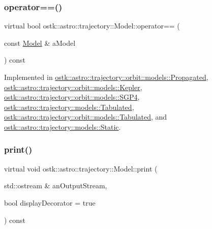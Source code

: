 \subsubsection{\texorpdfstring{operator==()}{operator==()}}
{\footnotesize\ttfamily virtual bool ostk\+::astro\+::trajectory\+::\+Model\+::operator== (\begin{DoxyParamCaption}\item[{const \hyperlink{classostk_1_1astro_1_1trajectory_1_1_model}{Model} \&}]{a\+Model }\end{DoxyParamCaption}) const\hspace{0.3cm}{\ttfamily [pure virtual]}}



Implemented in \hyperlink{classostk_1_1astro_1_1trajectory_1_1orbit_1_1models_1_1_propagated_a29b52ccf653fbd84699edab0f198f590}{ostk\+::astro\+::trajectory\+::orbit\+::models\+::\+Propagated}, \hyperlink{classostk_1_1astro_1_1trajectory_1_1orbit_1_1models_1_1_kepler_ad2a61eb0cbd9887fc2180dc0818c209e}{ostk\+::astro\+::trajectory\+::orbit\+::models\+::\+Kepler}, \hyperlink{classostk_1_1astro_1_1trajectory_1_1orbit_1_1models_1_1_s_g_p4_ad51d979b8b9b37251b6381cfe9df55ea}{ostk\+::astro\+::trajectory\+::orbit\+::models\+::\+S\+G\+P4}, \hyperlink{classostk_1_1astro_1_1trajectory_1_1models_1_1_tabulated_a9d206aee35ebabe4b36ddfc057142f16}{ostk\+::astro\+::trajectory\+::models\+::\+Tabulated}, \hyperlink{classostk_1_1astro_1_1trajectory_1_1orbit_1_1models_1_1_tabulated_abd72010cb413d8479c097376bfebaf56}{ostk\+::astro\+::trajectory\+::orbit\+::models\+::\+Tabulated}, and \hyperlink{classostk_1_1astro_1_1trajectory_1_1models_1_1_static_a0ef36b672baa80f522135d86f3b6bb9c}{ostk\+::astro\+::trajectory\+::models\+::\+Static}.

\mbox{\label{classostk_1_1astro_1_1trajectory_1_1_model_a4b2098483430a820481ed50b81656e31}} 
\subsubsection{\texorpdfstring{print()}{print()}}
{\footnotesize\ttfamily virtual void ostk\+::astro\+::trajectory\+::\+Model\+::print (\begin{DoxyParamCaption}\item[{std\+::ostream \&}]{an\+Output\+Stream,  }\item[{bool}]{display\+Decorator = {\ttfamily true} }\end{DoxyParamCaption}) const\hspace{0.3cm}{\ttfamily [pure virtual]}}




